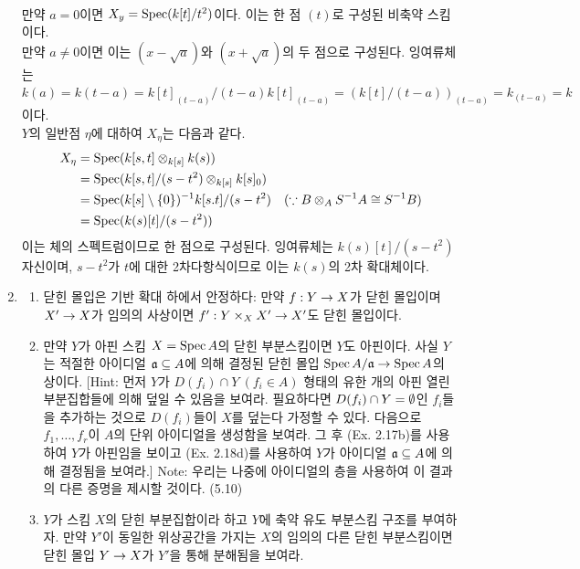 \begin{enumerate}[label=\tb{3.\arabic*.},itemindent=0mm,itemsep=4mm]
\begin{align*}
	\end{align*}
	만약 $a=0$이면 $X_y=\operatorname{Spec}(k[t]/t^2)$이다. 이는 한 점 $(t)$로 구성된 비축약 스킴이다.\\
	만약 $a\ne 0$이면 이는 $(x-\sqrt a)$와 $(x+\sqrt a)$의 두 점으로 구성된다.
	잉여류체는 $k(a)=k(t-a)=k[t]_{(t-a)}/(t-a)k[t]_{(t-a)}=(k[t]/(t-a))_{(t-a)}=k_{(t-a)}=k$이다.\\
	$Y$의 일반점 $\eta$에 대하여 $X_\eta$는 다음과 같다.
	\begin{align*}
	X_\eta&=\operatorname{Spec}(k[s,t]\otimes_{k[s]}k(s))\\
	&=\operatorname{Spec}(k[s,t]/(s-t^2)\otimes_{k[s]}k[s]_0)\\
	&=\operatorname{Spec}(k[s]\setminus\{0\})^{-1}k[s.t]/(s-t^2)\quad(\because B\otimes_AS^{-1}A\cong S^{-1}B)\\
	&=\operatorname{Spec}(k(s)[t]/(s-t^2))
	\end{align*}
	이는 체의 스펙트럼이므로 한 점으로 구성된다.
	잉여류체는 $k(s)[t]/(s-t^2)$ 자신이며, $s-t^2$가 $t$에 대한 2차다항식이므로 이는 $k(s)$의 2차 확대체이다.
	\item {}
	\begin{enumerate}[label=(\alph*)]
	\item 닫힌 몰입은 기반 확대 하에서 안정하다: 만약 $f:Y\rightarrow X$가 닫힌 몰입이며 $X'\rightarrow X$가 임의의 사상이면
	$f':Y\times_XX'\rightarrow X'$도 닫힌 몰입이다.
	\end{enumerate}
	\begin{enumerate}[label=*(\alph*)]
	\setcounter{enumii}{1}
	\item 만약 $Y$가 아핀 스킴 $X=\operatorname{Spec} A$의 닫힌 부분스킴이면 $Y$도 아핀이다.
	사실 $Y$는 적절한 아이디얼 $\mathfrak{a}\subseteq A$에 의해 결정된 닫힌 몰입 $\operatorname{Spec} A/\mathfrak{a}\rightarrow\operatorname{Spec} A$의 상이다.
	[Hint: 먼저 $Y$가 $D(f_i)\cap Y\:(f_i\in A)$ 형태의 유한 개의 아핀 열린 부분집합들에 의해 덮일 수 있음을 보여라.
	필요하다면 $D(f_i)\cap Y=\emptyset$인 $f_i$들을 추가하는 것으로 $D(f_i)$들이 $X$를 덮는다 가정할 수 있다.
	다음으로 $f_1,\ldots,f_r$이 $A$의 단위 아이디얼을 생성함을 보여라.
	그 후 (Ex. 2.17b)를 사용하여 $Y$가 아핀임을 보이고 (Ex. 2.18d)를 사용하여 $Y$가 아이디얼 $\mathfrak{a}\subseteq A$에 의해 결정됨을 보여라.]
	Note: 우리는 나중에 아이디얼의 층을 사용하여 이 결과의 다른 증명을 제시할 것이다. (5.10)
	\end{enumerate}
	\begin{enumerate}[label=(\alph*)]
	\setcounter{enumii}{2}
	\item $Y$가 스킴 $X$의 닫힌 부분집합이라 하고 $Y$에 축약 유도 부분스킴 구조를 부여하자.
	만약 $Y'$이 동일한 위상공간을 가지는 $X$의 임의의 다른 닫힌 부분스킴이면 닫힌 몰입 $Y\rightarrow X$가 $Y'$을 통해 분해됨을 보여라.

\end{enumerate}
\end{enumerate}
